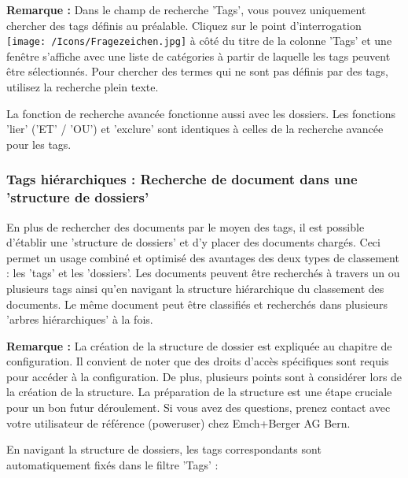 \vspace{\baselineskip}

\textbf{Remarque :} Dans le champ de recherche 'Tags', vous pouvez uniquement chercher des tags définis au préalable. Cliquez sur le point d'interrogation \texttt{[image: /Icons/Fragezeichen.jpg]} à côté du titre de la colonne 'Tags' et une fenêtre s'affiche avec une liste de catégories à partir de laquelle les tags peuvent être sélectionnés. Pour chercher des termes qui ne sont pas définis par des tags, utilisez la recherche plein texte.

\vspace{\baselineskip}

La fonction de recherche avancée fonctionne aussi avec les dossiers. Les fonctions 'lier' ('ET' / 'OU') et 'exclure' sont identiques à celles de la recherche avancée pour les tags.

\subsubsection{Tags hiérarchiques : Recherche de document dans une 'structure de dossiers'}

En plus de rechercher des documents par le moyen des tags, il est possible d'établir une 'structure de dossiers' et d'y placer des documents chargés. Ceci permet un usage combiné et optimisé des avantages des deux types de classement : les 'tags' et les 'dossiers'. Les documents peuvent être recherchés à travers un ou plusieurs tags ainsi qu'en navigant la structure hiérarchique du classement des documents. Le même document peut être classifiés et recherchés dans plusieurs 'arbres hiérarchiques' à la fois.

\vspace{\baselineskip}

\textbf{Remarque :} La création de la structure de dossier est expliquée au chapitre de configuration. Il convient de noter que des droits d'accès spécifiques sont requis pour accéder à la configuration. De plus, plusieurs points sont à considérer lors de la création de la structure. La préparation de la structure est une étape cruciale pour un bon futur déroulement. Si vous avez des questions, prenez contact avec votre utilisateur de référence (poweruser) chez Emch+Berger AG Bern.

\vspace{\baselineskip}

En navigant la structure de dossiers, les tags correspondants sont automatiquement fixés dans le filtre 'Tags' :

